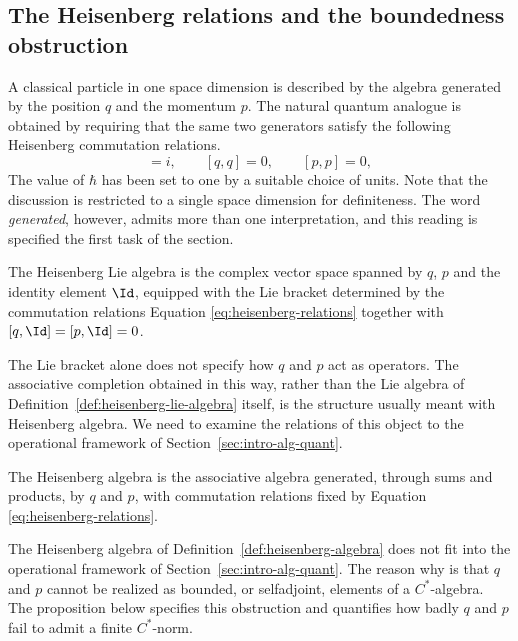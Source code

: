 	\subsection*{The Heisenberg relations and the boundedness obstruction}
	
	A classical particle in one space dimension is described by the algebra generated by the position $q$ and the momentum $p$. The natural quantum analogue is obtained by requiring that the same two generators satisfy the following Heisenberg commutation relations.
	\begin{equation}
		[q,p]=i, \qquad [q,q]=0, \qquad [p,p]=0,
		\label{eq:heisenberg-relations}
	\end{equation}
	 The value of $\hbar$ has been set to one by a suitable choice of units. Note that the discussion is restricted to a single space dimension for definiteness. The word \emph{generated}, however, admits more than one interpretation, and this reading is specified the first task of the section.
	
	\begin{definition}
		\label{def:heisenberg-lie-algebra}
		The Heisenberg Lie algebra is the complex vector space spanned by $q$, $p$ and the identity element $\Id$, equipped with the Lie bracket determined by the commutation relations Equation \eqref{eq:heisenberg-relations} together with $[q,\Id]=[p,\Id]=0$.
	\end{definition}
	
	\noindent The Lie bracket alone does not specify how $q$ and $p$ act as operators. The associative completion obtained in this way, rather than the Lie algebra of Definition~\ref{def:heisenberg-lie-algebra} itself, is the structure usually meant with Heisenberg algebra. We need to examine the relations of this object to the operational framework of Section~\ref{sec:intro-alg-quant}.
	
	\begin{definition}
		\label{def:heisenberg-algebra}
		The Heisenberg algebra is the associative algebra generated, through sums and products, by $q$ and $p$, with commutation relations fixed by Equation \eqref{eq:heisenberg-relations}.
	\end{definition}
	
	\noindent The Heisenberg algebra of Definition~\ref{def:heisenberg-algebra} does not fit into the operational framework of Section~\ref{sec:intro-alg-quant}. The reason why is that $q$ and $p$ cannot be realized as bounded, or selfadjoint, elements of a $C^*$-algebra. The proposition below specifies this obstruction and quantifies how badly $q$ and $p$ fail to admit a finite $C^*$-norm.
	

